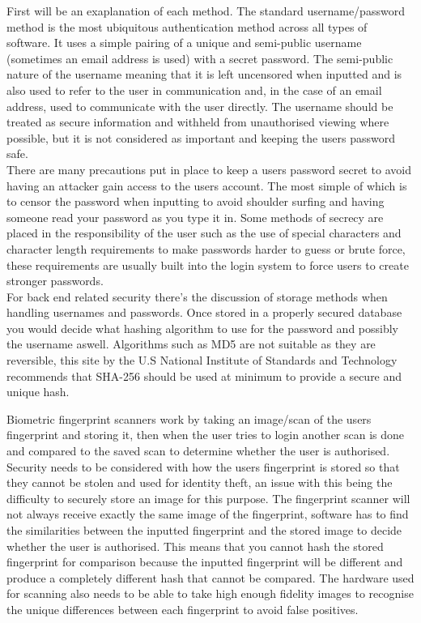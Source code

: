 \documentclass{ueacmpstyle}
\begin{document}
    First will be an exaplanation of each method. The standard username/password method is 
    the most ubiquitous authentication method across all types of software. It uses a simple 
    pairing of a unique and semi-public username (sometimes an email address is used) with a 
    secret password. The semi-public nature of the username meaning that it is left 
    uncensored when inputted and is also used to refer to the user in communication and, in 
    the case of an email address, used to communicate with the user directly. The username 
    should be treated as secure information and withheld from unauthorised viewing where 
    possible, but it is not considered as important and keeping the users password safe. 
    \\
    There are many precautions put in place to keep a users password secret to avoid having 
    an attacker gain access to the users account. The most simple of which is to censor the 
    password when inputting to avoid shoulder surfing and having someone read your password 
    as you type it in. Some methods of secrecy are placed in the responsibility of the user 
    such as the use of special characters and character length requirements to make passwords 
    harder to guess or brute force, these requirements are usually built into the login 
    system to force users to create stronger passwords. 
    \\
    For back end related security there's the discussion of storage methods when handling 
    usernames and passwords. Once stored in a properly secured database you would decide 
    what hashing algorithm to use for the password and possibly the username aswell. 
    Algorithms such as MD5 are not suitable as they are reversible, this site \citep{NISTHashFunctions} 
    by the U.S National Institute of Standards and Technology recommends that SHA-256 
    should be used at minimum to provide a secure and unique hash. 

    Biometric fingerprint scanners work by taking an image/scan of the users fingerprint 
    and storing it, then when the user tries to login another scan is done and compared to 
    the saved scan to determine whether the user is authorised. Security needs to be 
    considered with how the users fingerprint is stored so that they cannot be stolen and 
    used for identity theft, an issue with this being the difficulty to securely store an 
    image for this purpose. The fingerprint scanner will not always receive exactly the 
    same image of the fingerprint, software has to find the similarities between the 
    inputted fingerprint and the stored image to decide whether the user is authorised. 
    This means that you cannot hash the stored fingerprint for comparison because the 
    inputted fingerprint will be different and produce a completely different hash that 
    cannot be compared. The hardware used for scanning also needs to be able to take 
    high enough fidelity images to recognise the unique differences between each fingerprint 
    to avoid false positives.
\end{document}
